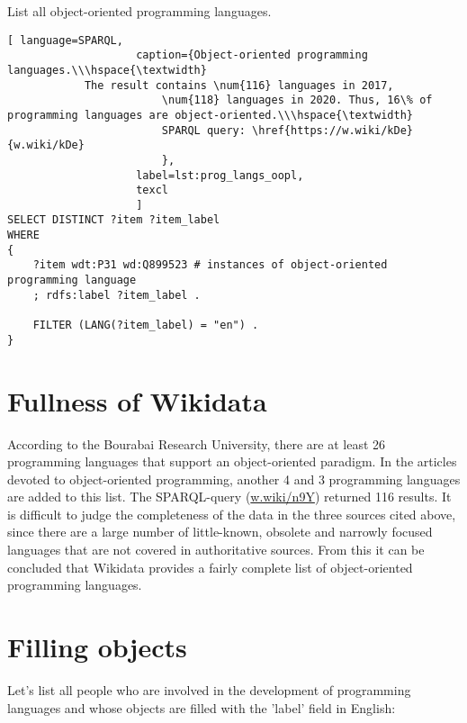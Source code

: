 List all object-oriented programming languages.

\begin{lstlisting}[ language=SPARQL, 
                    caption={Object-oriented programming languages.\\\hspace{\textwidth}
			The result contains \num{116} languages in 2017, 
                        \num{118} languages in 2020. Thus, 16\% of programming languages are object-oriented.\\\hspace{\textwidth}
                        SPARQL query: \href{https://w.wiki/kDe}{w.wiki/kDe}
                        },
                    label=lst:prog_langs_oopl,
                    texcl 
                    ]
SELECT DISTINCT ?item ?item_label
WHERE
{
    ?item wdt:P31 wd:Q899523 # instances of object-oriented programming language
    ; rdfs:label ?item_label . 

    FILTER (LANG(?item_label) = "en") . 
}
\end{lstlisting}%

\section{Fullness of Wikidata}

According to the Bourabai Research University, there are at least 26 programming languages that support an object-oriented paradigm. In the articles devoted to object-oriented programming, another 4 and 3 programming languages are added to this list. The SPARQL-query (\href{https://w.wiki/n9Y}{w.wiki/n9Y}) returned 116 results. It is difficult to judge the completeness of the data in the three sources cited above, since there are a large number of little-known, obsolete and narrowly focused languages that are not covered in authoritative sources. From this it can be concluded that Wikidata provides a fairly complete list of object-oriented programming languages.

\section{Filling objects}

Let's list all people who are involved in the development of programming languages and whose objects are filled with the 'label' field in English:

